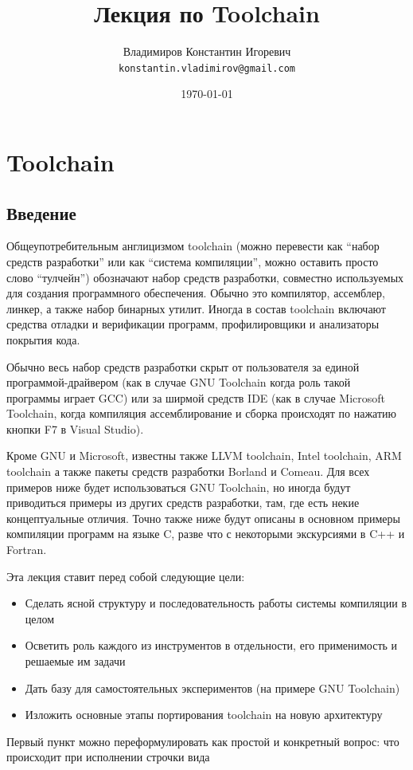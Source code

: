 \documentclass[a4paper,12pt,oneside]{article}
\title{Лекция по Toolchain}
\author{
  Владимиров Константин Игоревич\\
  \texttt{konstantin.vladimirov@gmail.com}
}
\date{\today}
\begin{document}
\section{Toolchain}\label{Toolchain}

\subsection{Введение}\label{Introduction}

Общеупотребительным англицизмом toolchain (можно перевести как ``набор средств разработки'' или как ``система компиляции'', можно оставить просто слово ``тулчейн'') обозначают набор средств разработки, совместно используемых для создания программного обеспечения. Обычно это компилятор, ассемблер, линкер, а также набор бинарных утилит. Иногда в состав toolchain включают средства отладки и верификации программ, профилировщики и анализаторы покрытия кода.

Обычно весь набор средств разработки скрыт от пользователя за единой программой-драйвером (как в случае GNU Toolchain когда роль такой программы играет GCC) или за ширмой средств IDE (как в случае Microsoft Toolchain, когда компиляция ассемблирование и сборка происходят по нажатию кнопки F7 в Visual Studio).

Кроме GNU и Microsoft, известны также LLVM toolchain, Intel toolchain, ARM toolchain а также пакеты средств разработки Borland и Comeau. Для всех примеров ниже будет использоваться GNU Toolchain, но иногда будут приводиться примеры из других средств разработки, там, где есть некие концептуальные отличия. Точно также ниже будут описаны в основном примеры компиляции программ на языке C, разве что с некоторыми экскурсиями в C++ и Fortran.

Эта лекция ставит перед собой следующие цели:

\begin{itemize}
\item Сделать ясной структуру и последовательность работы системы компиляции в целом
\item Осветить роль каждого из инструментов в отдельности, его применимость и решаемые им задачи
\item Дать базу для самостоятельных экспериментов (на примере GNU Toolchain)
\item Изложить основные этапы портирования toolchain на новую архитектуру
\end{itemize}

Первый пункт можно переформулировать как простой и конкретный вопрос: что происходит при исполнении строчки вида
\end{document}
